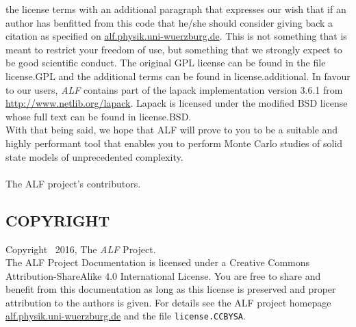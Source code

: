 the license terms with an additional paragraph that expresses our wish that if an author has benfitted from this code
that he/she should consider giving back a citation as specified on \url{alf.physik.uni-wuerzburg.de}.
This is not something that is meant to restrict your freedom of use, but something that we strongly expect to be good scientific conduct.
The original GPL license can be found in the file license.GPL and the additional terms can be found in license.additional.
In favour to our users, \textit{ALF} contains part of the lapack implementation version 3.6.1 from \url{http://www.netlib.org/lapack}.
Lapack is licensed under the modified BSD license whose full text can be found in license.BSD.\\
With that being said, we hope that ALF will prove to you to be a suitable and highly performant tool that enables
you to perform Monte Carlo studies of solid state models of unprecedented complexity.\\
\\
The ALF project's contributors.\\
                        
\subsection*{COPYRIGHT}

Copyright \textcopyright ~2016, The \textit{ALF} Project.\\
The ALF Project Documentation 
is licensed under a Creative Commons Attribution-ShareAlike 4.0 International License.
You are free to share and benefit from this documentation as long as this license is preserved
and proper attribution to the authors is given. For details see the ALF project
homepage \url{alf.physik.uni-wuerzburg.de} and the file \texttt{license.CCBYSA}.
